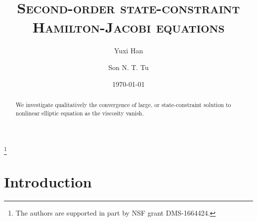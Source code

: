 \documentclass[11pt,reqno]{amsart}
\numberwithin{figure}{section}
\theoremstyle{plain}
\theoremstyle{remark}
\numberwithin{equation}{section}
\begin{document}
\title[Rate of convergence]
{\textsc{Second-order state-constraint Hamilton-Jacobi equations}}
\thanks{The authors are supported in part by NSF grant DMS-1664424.}
\begin{abstract}
We investigate qualitatively the convergence of large, or state-constraint solution to nonlinear elliptic equation as the viscosity vanish.
\end{abstract}
\author{Yuxi Han}
\address[Y. Han]
{
Department of Mathematics, 
University of Wisconsin Madison, 480 Lincoln  Drive, Madison, WI 53706, USA}
\author{Son N. T. Tu}
\address[S. N.T. Tu]
{
Department of Mathematics, 
University of Wisconsin Madison, 480 Lincoln  Drive, Madison, WI 53706, USA}
\date{\today}
\maketitle
\setcounter{tocdepth}{1}
\tableofcontents

\section{Introduction}\label{sec:intro}
\end{document}
